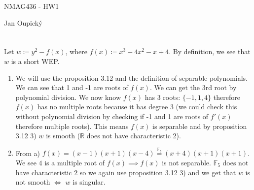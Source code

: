 \documentclass[12pt, a4paper]{article}
\begin{document}
\begin{center}
\large NMAG436 - HW1

\normalsize Jan Oupický
\end{center}
\vspace{1\baselineskip}

\section{}
Let $w \coloneqq y^2 - f(x)$, where $f(x) \coloneqq x^3-4x^2-x+4$. By definition, we see that $w$ is a short WEP.
\begin{enumerate}[label=(\alph*)]
\item We will use the proposition 3.12 and the definition of separable polynomials. We can see that 1 and -1 are roots of $f(x)$. We can get the 3rd root by polynomial division. We now know $f(x)$ has 3 roots: $\{-1, 1, 4\}$ therefore $f(x)$ has no multiple roots because it has degree 3 (we could check this without polynomial division by checking if -1 and 1 are roots of $f'(x)$ therefore multiple roots). This means $f(x)$ is separable and by proposition 3.12 3) $w$ is smooth ($\mathbb{R}$ does not have characteristic 2).

\item From a) $f(x) = (x-1)(x+1)(x-4) \stackrel{\mathbb{F}_5}{=} (x+4)(x+1)(x+1)$. We see $4$ is a multiple root of $f(x) \implies f(x)$ is not separable. $\mathbb{F}_5$ does not have characteristic 2 so we again use proposition 3.12 3) and we get that $w$ is not smooth $\iff$ $w$ is singular.  
\end{enumerate}
\end{document}
